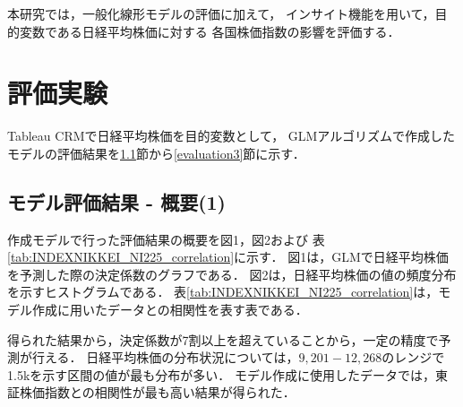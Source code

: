 \documentclass[submit,techrep,noauthor]{ipsj}
\begin{document}
本研究では，一般化線形モデルの評価に加えて，
インサイト機能を用いて，目的変数である日経平均株価に対する
各国株価指数の影響を評価する．

\section{評価実験}
Tableau CRMで日経平均株価を目的変数として，
GLMアルゴリズムで作成したモデルの評価結果を\ref{evaluation1}節から\ref{evaluation3}節に示す．

\subsection{モデル評価結果 - 概要(1)}\label{evaluation1}
作成モデルで行った評価結果の概要を図1，図2および
表\ref{tab:INDEXNIKKEI_NI225_correlation}に示す．
%
図1は，GLMで日経平均株価を予測した際の決定係数のグラフである．
図2は，日経平均株価の値の頻度分布を示すヒストグラムである．
表\ref{tab:INDEXNIKKEI_NI225_correlation}は，モデル作成に用いたデータとの相関性を表す表である．

得られた結果から，決定係数が7割以上を超えていることから，一定の精度で予測が行える．
日経平均株価の分布状況については，$9,201-12,268$のレンジで1.5kを示す区間の値が最も分布が多い．
モデル作成に使用したデータでは，東証株価指数との相関性が最も高い結果が得られた．
\end{document}

